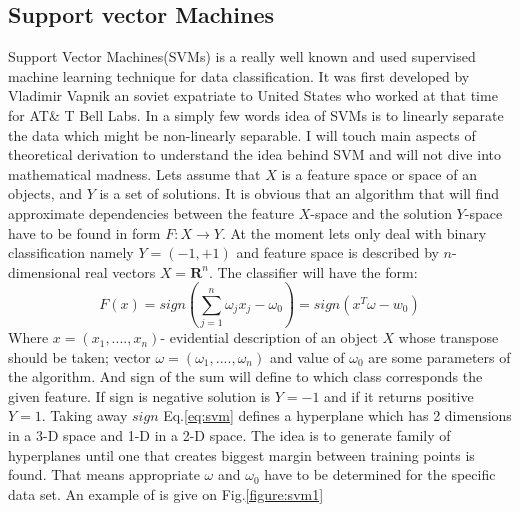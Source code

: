 \subsection{Support vector Machines}
Support Vector Machines(SVMs) is a really well known and used supervised machine learning technique for data classification. It was first developed by Vladimir Vapnik an soviet expatriate to United States who worked at that time for AT\& T Bell Labs. In a simply few words idea of SVMs is to linearly separate the data which might be non-linearly separable. I will touch main aspects of theoretical derivation to understand the idea behind SVM and will not dive into mathematical madness.
Lets assume that $X$ is a feature space or space of an objects, and $Y$ is a set of solutions. It is obvious that an algorithm that will find approximate dependencies between the feature $X$-space and the solution $Y$-space have to be found in form $F:X\rightarrow Y$.  At the moment lets only deal with binary classification    namely $Y=(-1,+1)$ and feature space is described by $n$-dimensional real vectors $X=\mathbf{R}^n$. 
The classifier will have the form: 
\begin{equation}\label{eq:svm}
F(x)=sign(\sum_{j=1}^{n} \omega_j x_j-\omega_0)=sign(x^{T}\omega-w_0)
\end{equation}
Where $x=(x_1,....,x_n)$- evidential description of an object $X$ whose transpose should be taken; vector $\omega=(\omega_1,....,\omega_n)$ and value of $\omega_0$ are some parameters of the algorithm. And sign of the sum will define to which class corresponds the given feature. If sign is negative solution is $Y=-1$ and if it returns positive $Y=1$. Taking away $sign$ Eq.\ref{eq:svm} defines a hyperplane which has 2 dimensions in a 3-D space and 1-D in a 2-D space. The idea is to generate family of hyperplanes until one that creates biggest margin between training points is found. That means appropriate $\omega$ and $\omega_0$ have to be determined for the specific data set. An example of is give on Fig.\ref{figure:svm1}    
